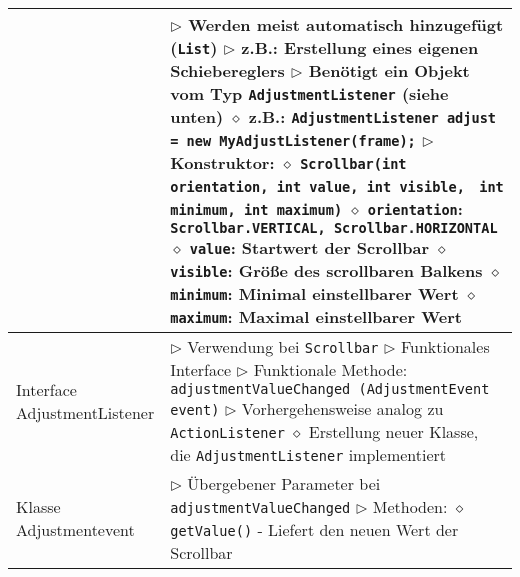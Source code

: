 \begin{longtable}{ | p{} p{} | }
	\makecell[l]{Klasse Scrollbar} & \makecell[l]{
	$\rhd$ Werden meist automatisch hinzugefügt (\texttt{List}) \\
	$\rhd$ z.B.: Erstellung eines eigenen Schiebereglers \\
	$\rhd$ Benötigt ein Objekt vom Typ \texttt{AdjustmentListener} (siehe unten) \\
	\hspace{0.4cm} $\diamond$ z.B.: \texttt{AdjustmentListener adjust = new MyAdjustListener(frame);} \\
	$\rhd$ Konstruktor: \\
	\hspace{0.4cm} $\diamond$ \texttt{Scrollbar(int orientation, int value, int visible,} \\
	\hspace{2.5cm} \texttt{ int minimum, int maximum)} \\
	\hspace{0.4cm} $\diamond$ \texttt{orientation}: \texttt{Scrollbar.VERTICAL, Scrollbar.HORIZONTAL} \\
	\hspace{0.4cm} $\diamond$ \texttt{value}: Startwert der Scrollbar \\
	\hspace{0.4cm} $\diamond$ \texttt{visible}: Grö\ss e des scrollbaren Balkens \\
	\hspace{0.4cm} $\diamond$ \texttt{minimum}: Minimal einstellbarer Wert \\
	\hspace{0.4cm} $\diamond$ \texttt{maximum}: Maximal einstellbarer Wert} \\ \hline

	\makecell[l]{Interface \\ AdjustmentListener} & \makecell[l]{
	$\rhd$ Verwendung bei \texttt{Scrollbar} \\
	$\rhd$ Funktionales Interface \\
	$\rhd$ Funktionale Methode: \texttt{adjustmentValueChanged (AdjustmentEvent event)} \\
	$\rhd$ Vorhergehensweise analog zu \texttt{ActionListener} \\
	\hspace{0.4cm} $\diamond$ Erstellung neuer Klasse, die \texttt{AdjustmentListener} implementiert} \\ \hline

	\makecell[l]{Klasse \\ Adjustmentevent} & \makecell[l]{$\rhd$ Übergebener Parameter bei \texttt{adjustmentValueChanged} \\
	$\rhd$ Methoden: \\
	\hspace{0.4cm} $\diamond$ \texttt{getValue()} \\
	\hspace{0.6cm} - Liefert den neuen Wert der Scrollbar} \\ \hline


\end{longtable}
